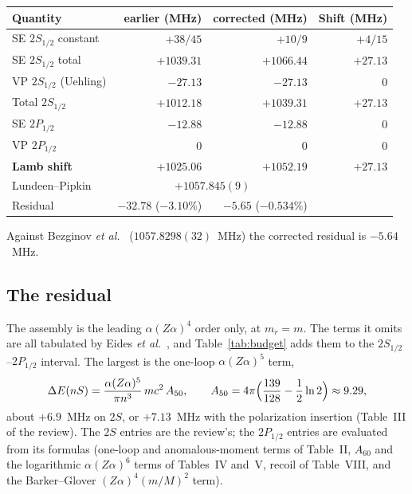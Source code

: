\documentclass[11pt]{article}
\begin{document}
\begin{center}
\begin{tabular}{l r r r}
\toprule
Quantity & earlier (MHz) & corrected (MHz) & Shift (MHz) \\
\midrule
SE $2S_{1/2}$ constant & $+38/45$ & $+10/9$ & $+4/15$ \\
SE $2S_{1/2}$ total & $+1039.31$ & $+1066.44$ & $+27.13$ \\
VP $2S_{1/2}$ (Uehling) & $-27.13$ & $-27.13$ & $0$ \\
Total $2S_{1/2}$ & $+1012.18$ & $+1039.31$ & $+27.13$ \\
SE $2P_{1/2}$ & $-12.88$ & $-12.88$ & $0$ \\
VP $2P_{1/2}$ & $0$ & $0$ & $0$ \\
\midrule
\textbf{Lamb shift} & \textbf{$+1025.06$} & \textbf{$+1052.19$} & \textbf{$+27.13$} \\
\midrule
Lundeen--Pipkin~\cite{lundeen_pipkin1981} & \multicolumn{2}{c}{$+1057.845(9)$} & \\
Residual & $-32.78$ ($-3.10\%$) & $-5.65$ ($-0.534\%$) & \\
\bottomrule
\end{tabular}
\end{center}

\noindent Against Bezginov \emph{et al.}~\cite{bezginov2019}
($1057.8298(32)$~MHz) the corrected residual is $-5.64$~MHz.

\subsection{The residual}
\label{sec:residual}

The assembly is the leading $\alpha(Z\alpha)^4$ order only, at
$m_r = m$.  The terms it omits are all tabulated by Eides
\emph{et al.}~\cite{eides2001}, and Table~\ref{tab:budget} adds them
to the $2S_{1/2}$--$2P_{1/2}$ interval.  The largest is the one-loop
$\alpha(Z\alpha)^5$ term,
\begin{equation}
\label{eq:a50}
\Delta E(nS) = \frac{\alpha(Z\alpha)^5}{\pi n^3}\, m c^2\, A_{50},
\qquad A_{50} = 4\pi\Bigl(\frac{139}{128} - \frac12\ln 2\Bigr) \approx 9.29,
\end{equation}
about $+6.9$~MHz on $2S$, or $+7.13$~MHz with the polarization
insertion (Table~III of the review).  The $2S$ entries are the review's;
the $2P_{1/2}$ entries are evaluated from its formulas (one-loop and
anomalous-moment terms of Table~II, $A_{60}$ and the logarithmic
$\alpha(Z\alpha)^6$ terms of Tables~IV and~V, recoil of Table~VIII,
and the Barker--Glover $(Z\alpha)^4 (m/M)^2$ term).
\end{document}
